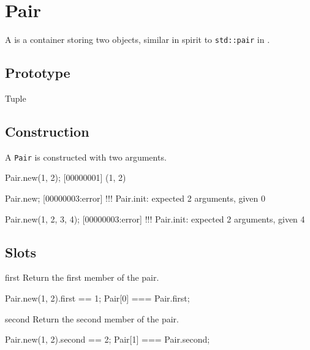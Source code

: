 
\section{Pair}

A  is a container storing two objects, similar in spirit to
\lstinline|std::pair| in \Cxx.

\subsection{Prototype}
\begin{refObjects}
\item[Tuple]
\end{refObjects}

\subsection{Construction}

A \lstinline|Pair| is constructed with two arguments.

\begin{urbiscript}[firstnumber=1]
Pair.new(1, 2);
[00000001] (1, 2)

Pair.new;
[00000003:error] !!! Pair.init: expected 2 arguments, given 0

Pair.new(1, 2, 3, 4);
[00000003:error] !!! Pair.init: expected 2 arguments, given 4
\end{urbiscript}

\subsection{Slots}
\begin{urbiscriptapi}
\item[first]
  Return the first member of the pair.
\begin{urbiassert}
Pair.new(1, 2).first == 1;
Pair[0] === Pair.first;
\end{urbiassert}

\item[second]
  Return the second member of the pair.
\begin{urbiassert}
Pair.new(1, 2).second == 2;
Pair[1] === Pair.second;
\end{urbiassert}
\end{urbiscriptapi}




